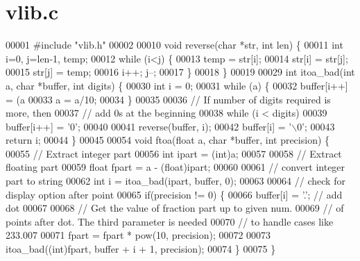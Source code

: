 \section{vlib.\+c}
\label{vlib_8c_source}

\begin{DoxyCode}
00001 \textcolor{preprocessor}{#include "vlib.h"}
00002 
00010 \textcolor{keywordtype}{void} reverse(\textcolor{keywordtype}{char} *str, \textcolor{keywordtype}{int} len) \{
00011     \textcolor{keywordtype}{int} i=0, j=len-1, temp;
00012     \textcolor{keywordflow}{while} (i<j) \{
00013         temp = str[i];
00014         str[i] = str[j];
00015         str[j] = temp;
00016         i++; j--;
00017     \}
00018 \}
00019 
00029 \textcolor{keywordtype}{int} itoa_bad(\textcolor{keywordtype}{int} a, \textcolor{keywordtype}{char} *buffer, \textcolor{keywordtype}{int} digits) \{
00030   \textcolor{keywordtype}{int} i = 0;
00031    \textcolor{keywordflow}{while} (a) \{
00032        buffer[i++] = (a%
00033        a = a/10;
00034    \}
00035 
00036    \textcolor{comment}{// If number of digits required is more, then}
00037    \textcolor{comment}{// add 0s at the beginning}
00038    \textcolor{keywordflow}{while} (i < digits)
00039        buffer[i++] = \textcolor{charliteral}{'0'};
00040 
00041    reverse(buffer, i);
00042    buffer[i] = \textcolor{charliteral}{'\(\backslash\)0'};
00043    \textcolor{keywordflow}{return} i;
00044 \}
00045 
00054 \textcolor{keywordtype}{void} ftoa(\textcolor{keywordtype}{float} a, \textcolor{keywordtype}{char} *buffer, \textcolor{keywordtype}{int} precision) \{
00055   \textcolor{comment}{// Extract integer part}
00056   \textcolor{keywordtype}{int} ipart = (int)a;
00057 
00058   \textcolor{comment}{// Extract floating part}
00059   \textcolor{keywordtype}{float} fpart = a - (float)ipart;
00060 
00061   \textcolor{comment}{// convert integer part to string}
00062   \textcolor{keywordtype}{int} i = itoa_bad(ipart, buffer, 0);
00063 
00064   \textcolor{comment}{// check for display option after point}
00065   \textcolor{keywordflow}{if}(precision != 0) \{
00066     buffer[i] = \textcolor{charliteral}{'.'};  \textcolor{comment}{// add dot}
00067 
00068     \textcolor{comment}{// Get the value of fraction part up to given num.}
00069     \textcolor{comment}{// of points after dot. The third parameter is needed}
00070     \textcolor{comment}{// to handle cases like 233.007}
00071     fpart = fpart * pow(10, precision);
00072 
00073     itoa_bad((\textcolor{keywordtype}{int})fpart, buffer + i + 1, precision);
00074   \}
00075 \}
\end{DoxyCode}
